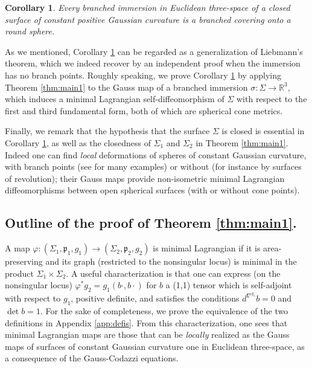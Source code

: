 \documentclass[JEP,XML,SOM,Unicode,NoEqCountersInSection,published]{cedram}
\newtheorem{cor}{Corollary}[section]
\theoremstyle{definition}
\newcommand{\R}{{\mathbb R}}
\begin{document}
\begin{cor}\label{cor:rigidity}
Every branched immersion in Euclidean three-space of a closed surface of constant positive Gaussian curvature is a branched covering onto a round sphere.
\end{cor}

As we mentioned, Corollary \ref{cor:rigidity} can be regarded as a generalization of Liebmann's theorem, which we indeed recover by an independent proof when the immersion has no branch points. Roughly speaking, we prove Corollary \ref{cor:rigidity} by applying Theorem \ref{thm:main1} to the Gauss map of a branched immersion $\sigma:\Sigma\to\R^3$, which induces a minimal Lagrangian self-diffeomorphism of $\Sigma$ with respect to the first and third fundamental form, both of which are spherical cone metrics.

Finally, we remark that the hypothesis that the surface $\Sigma$ is closed is essential in Corollary \ref{cor:rigidity}, as well as the closedness of $\Sigma_1$ and $\Sigma_2$ in Theorem \ref{thm:main1}. Indeed one can find \emph{local} deformations of spheres of constant Gaussian curvature, with branch points (see \cite{zbMATH06599450} for many examples) or without (for instance by surfaces of revolution); their Gauss maps provide non-isometric minimal Lagrangian diffeomorphisms between open spherical surfaces (with or without cone points).

\subsection{Outline of the proof of Theorem \ref{thm:main1}.} \label{sec:outline}

A map $\varphi:(\Sigma_1,\mathfrak p_1,g_1)\to(\Sigma_2,\mathfrak p_2,g_2)$ is minimal Lagrangian if it is area-preserving and its graph (restricted to the nonsingular locus) is minimal in the product $\Sigma_1\times\Sigma_2$. A useful characterization is that one can express (on the nonsingular locus) $\varphi^*g_2=g_1(b\cdot,b\cdot)$ for $b$ a (1,1) tensor which is self-adjoint with respect to $g_1$, positive definite, and satisfies the conditions $d^{\nabla^{g_1}}\!b=0$ and $\det b=1$. For the sake of completeness, we prove the equivalence of the two definitions in Appendix \ref{app:defis}. From this characterization, one sees that minimal Lagrangian maps are those that can be \emph{locally} realized as the Gauss maps of surfaces of constant Gaussian curvature one in Euclidean three-space, as a consequence of the Gauss-Codazzi equations.
\end{document}
